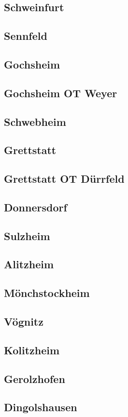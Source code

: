 \documentclass[fontsize=12pt,a4paper]{scrreprt}
\begin{document}
\subsection{Schweinfurt}
\subsection{Sennfeld}
\subsection{Gochsheim}
\subsection{Gochsheim OT Weyer}
\subsection{Schwebheim}
\subsection{Grettstatt}
\subsection{Grettstatt OT Dürrfeld}
\subsection{Donnersdorf}
\subsection{Sulzheim}
\subsection{Alitzheim}
\subsection{Mönchstockheim}
\subsection{Vögnitz}
\subsection{Kolitzheim}
\subsection{Gerolzhofen}
\subsection{Dingolshausen}
\end{document}
